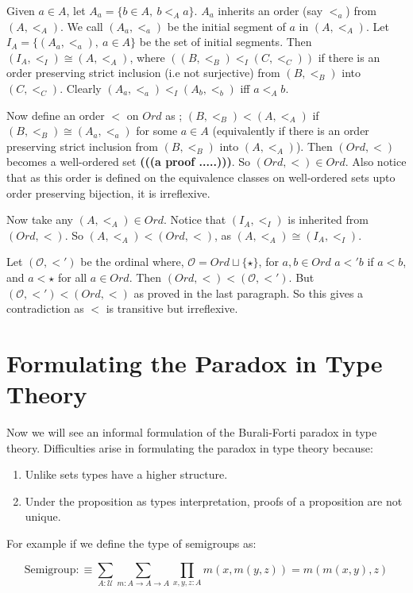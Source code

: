 \documentclass[11pt]{article}
\theoremstyle{definition}
\theoremstyle{plain}
\theoremstyle{remark}
\newcommand{\U}{\mathscr{U}}
\begin{document}
Given $a\in A$, let $A_a = \{b \in A,\ b <_A a \}$. $A_a$ inherits an order (say $<_a$)
from $(A, <_A)$. We call $(A_a, <_a)$ be the initial segment of $a$ in $(A, <_A)$. Let
$I_A = \{(A_a, <_a),\ a\in A\}$ be the set of initial segments. Then 
$(I_A,<_I) \cong (A, <_A)$, where $((B,<_B) <_I (C,<_C))$ if there is an order preserving 
strict inclusion (i.e not surjective) from $(B,<_B)$ into $(C,<_C)$. Clearly 
$(A_a,<_a) <_I (A_b,<_b)$ iff $a <_A b$.\smallskip

Now define an order $<$ on $Ord$ as ; $(B,<_B) < (A, <_A)$ if $(B, <_B) \cong (A_a, <_a)$ 
for some $a \in A$ (equivalently if there is an order preserving strict inclusion 
from $(B,<_B)$ into $(A,<_A)$). Then $(Ord, <)$ becomes a well-ordered set 
\textbf{(((a proof .....)))}. So $(Ord, <) \in Ord$. Also notice that as this order is defined 
on the equivalence classes on well-ordered sets upto order preserving bijection, it is 
irreflexive.\smallskip

Now take any $(A, <_A)\in Ord$. Notice that $(I_A, <_I)$ is inherited from ${(Ord, <)}$. So
$(A, <_A) < (Ord, <)$, as $(A,<_A) \cong (I_A, <_I)$.\smallskip

Let $(\mathcal{O}, <')$ be the ordinal where, $\mathcal{O} = Ord\sqcup \{\star\}$, for 
$a,b\in Ord$ $a<'b$ if $a<b$, and $a<\star$ for all $a\in Ord$. Then 
$(Ord,<)< (\mathcal{O},<')$. But $(\mathcal{O},<')<(Ord,<)$ as proved in the last paragraph.
So this gives a contradiction as $<$ is transitive but irreflexive. 

\section{Formulating the Paradox in Type Theory}\label{S:Form in TT}

Now we will see an informal formulation of the Burali-Forti paradox in type theory. 
Difficulties arise in formulating the paradox in type theory because:
\begin{enumerate}
\item Unlike sets types have a higher structure.
\item Under the proposition as types interpretation, proofs of a proposition are not unique.
\end{enumerate}

For example if we define the type of semigroups as:

\[ \text{Semigroup}:\equiv 	\sum_{A : \U} \sum_{m : A \to A \to A} 
    \prod_{x,y,z:A} m(x,m(y,z)) = m(m(x,y),z) \]
    
\end{document}
